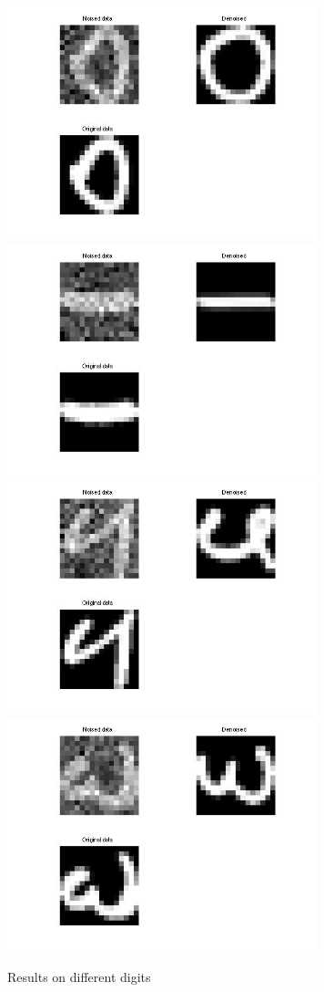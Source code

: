 \begin{figure}[H]
	\includegraphics[width=9cm]{result0.jpg}
	\subcaption{}\label{fig:awesome_image1}
	\endminipage\hfill
	\includegraphics[width=9cm]{result1.jpg}
	\subcaption{}\label{fig:awesome_image2}
	\endminipage \\
	\includegraphics[width=9cm]{result2.jpg}
	\subcaption{}\label{fig:awesome_image2}
	\endminipage \hfill
	\includegraphics[width=9cm]{result3.jpg}
	\subcaption{}\label{fig:awesome_image2}
	\endminipage
	\caption{Results on different digits}
\end{figure} 
